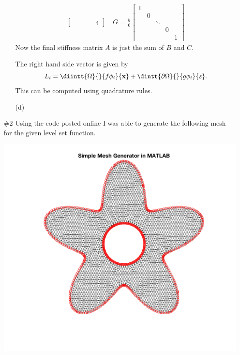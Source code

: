 \documentclass[11pt, titlepage]{article}
\begin{document}
\begin{enumerate}
\begin{enumerate}
\begin{align*}
\begin{bmatrix}
              &   &        &   & 4
          \end{bmatrix} \quad
          G =
          \frac{h}{6}
          \begin{bmatrix}
            1 &   &        &   & \\
              & 0 &        &   & \\
              &   & \ddots &   & \\
              &   &        & 0 & \\
              &   &        &   & 1
          \end{bmatrix}
        \end{align*}
        Now the final stiffness matrix $A$ is just the sum of $B$ and $C$.

        The right hand side vector is given by
        \[
          L_i = \diintt{\Omega}{}{f \phi_i}{\v{x}} + \dintt{\partial \Omega}{}{g\phi_i}{s}.
        \]
        This can be computed using quadrature rules.

      \item[(d)]

    \end{enumerate}

  \item[\#2]
    Using the code posted online I was able to generate the following mesh for
    the given level set function.

    \begin{center}
      \includegraphics[scale=0.3]{Figures/02_01.png}
    \end{center}


\end{enumerate}
\end{document}
